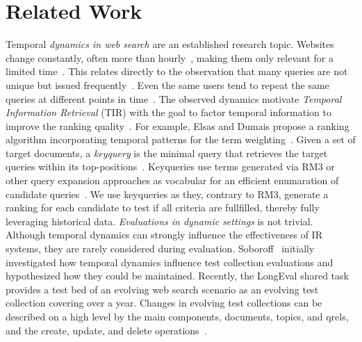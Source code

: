 \section{Related Work}
\label{sec:related-work}

Temporal \emph{dynamics in web search} are an established research topic. Websites change constantly, often more than hourly~\cite{DBLP:conf/wsdm/AdarTDE09},
making them only relevant for a limited time~\cite{DBLP:conf/sigir/TikhonovBBOKG13}. This relates directly to the observation that many queries are not unique but issued frequently~\cite{DBLP:conf/sigir/Dumais14,DBLP:journals/sigir/SilversteinHMM99}. Even the same users tend to repeat the same queries at different points in time~\cite{DBLP:conf/wsdm/TylerT10}.
The observed dynamics motivate \emph{Temporal Information Retrieval} (TIR) with the goal to factor temporal information to improve the ranking quality~\cite{DBLP:journals/ftir/KanhabuaBN15,DBLP:journals/csur/CamposDJJ14}. For example, Elsas and Dumais propose a ranking algorithm incorporating temporal patterns for the term weighting~\cite{DBLP:conf/wsdm/ElsasD10}.
Given a set of target documents, a \emph{keyquery} is the minimal query that retrieves the target queries within its top-positions~\cite{gollub:2013a,hagen:2016b}. Keyqueries use terms generated via RM3 or other query expansion approaches as vocabular for an efficient enumaration of candidate queries~\cite{froebe:2022c,froebe:2021c}. We use keyqueries as they, contrary to RM3, generate a ranking for each candidate to test if all criteria are fullfilled, thereby fully leveraging historical data.
\emph{Evaluations in dynamic settings} is not trivial. Although temporal dynamics can strongly influence the effectiveness of IR systems, they are rarely  considered during evaluation. Soboroff~\cite{DBLP:conf/sigir/Soboroff06} initially investigated how temporal dynamics influence test collection evaluations and hypothesized how they could be maintained. Recently, the LongEval shared task~\cite{DBLP:conf/clef/AlkhalifaBDEAFG24,alkhalifa:2023} provides a test bed of an evolving web search scenario as an evolving test collection covering over a year. Changes in evolving test collections can be described on a high level by the main components, documents, topics, and qrels, and the create, update, and delete operations~\cite{keller:2024}. %
